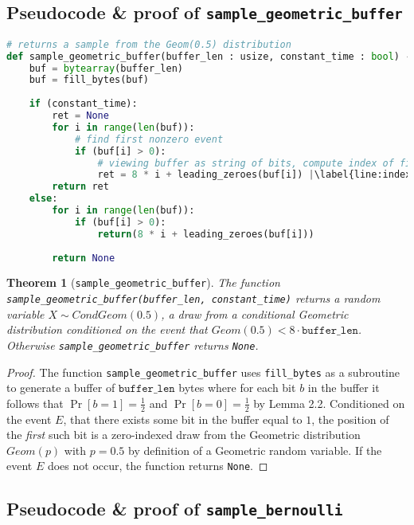\documentclass[11pt,a4paper]{article}
\newtheorem{theorem}{Theorem}[section]
\theoremstyle{definition}
\begin{document}
\subsection{Pseudocode \& proof of \texttt{sample\_geometric\_buffer}}
\begin{lstlisting}[language=Python, escapechar=|]
# returns a sample from the Geom(0.5) distribution
def sample_geometric_buffer(buffer_len : usize, constant_time : bool) -> Optional[uint]: |\label{line:geombuffer}|
    buf = bytearray(buffer_len)
    buf = fill_bytes(buf)
    
    if (constant_time): 
        ret = None
        for i in range(len(buf)):
            # find first nonzero event
            if (buf[i] > 0):
                # viewing buffer as string of bits, compute index of first nonzero bit
                ret = 8 * i + leading_zeroes(buf[i]) |\label{line:indexcmp}|
        return ret
    else:
        for i in range(len(buf)):
            if (buf[i] > 0):
                return(8 * i + leading_zeroes(buf[i]))
        
        return None
\end{lstlisting}

\begin{tcolorbox}
\begin{theorem}[\texttt{sample\_geometric\_buffer}]
The function \texttt{sample\_geometric\_buffer(buffer\_len, constant\_time)} returns a random variable $X \sim CondGeom(0.5)$, a draw from a conditional Geometric distribution conditioned on the event that $Geom(0.5) < 8 \cdot \texttt{buffer\_len}$. Otherwise \texttt{sample\_geometric\_buffer} returns \texttt{None}. 
\end{theorem}
\end{tcolorbox}

\begin{proof}
The function \texttt{sample\_geometric\_buffer} uses \texttt{fill\_bytes}  as a subroutine to generate a buffer of $\texttt{buffer\_len}$ bytes where for each bit $b$ in the buffer it follows that $\Pr[b = 1] = \frac{1}{2}$ and $\Pr[b = 0] = \frac{1}{2}$ by Lemma 2.2. Conditioned on the event $E$, that there exists some bit in the buffer equal to $1$, the position of the \emph{first} such bit is a zero-indexed draw from the Geometric distribution $Geom(p)$ with $p = 0.5$ by definition of a Geometric random variable. If the event $E$ does not occur, the function returns \texttt{None}. 
\end{proof}

\subsection{Pseudocode \& proof of \texttt{sample\_bernoulli}}
\end{document}
